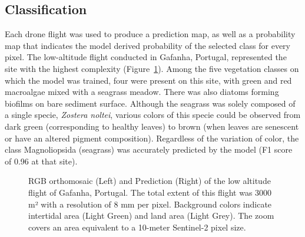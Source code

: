 \documentclass[
  number]{elsarticle}
\begin{document}
\subsection{Classification}\label{classification}

Each drone flight was used to produce a prediction map, as well as a
probability map that indicates the model derived probability of the
selected class for every pixel. The low-altitude flight conducted in
Gafanha, Portugal, represented the site with the highest complexity
(Figure~\ref{fig-GafLow}). Among the five vegetation classes on which
the model was trained, four were present on this site, with green and
red macroalgae mixed with a seagrass meadow. There was also diatoms
forming biofilms on bare sediment surface. Although the seagrass was
solely composed of a single specie, \emph{Zostera noltei}, various
colors of this specie could be observed from dark green (corresponding
to healthy leaves) to brown (when leaves are senescent or have an
altered pigment composition). Regardless of the variation of color, the
class Magnoliopsida (seagrass) was accurately predicted by the model (F1
score of 0.96 at that site).

\label{cell-fig-GafLow}
\begin{figure}[H]


\caption{\label{fig-GafLow}RGB orthomosaic (Left) and Prediction (Right)
of the low altitude flight of Gafanha, Portugal. The total extent of
this flight was 3000 m² with a resolution of 8 mm per pixel. Background
colors indicate intertidal area (Light Green) and land area (Light
Grey). The zoom covers an area equivalent to a 10-meter Sentinel-2 pixel
size.}

\end{figure}%
\end{document}
